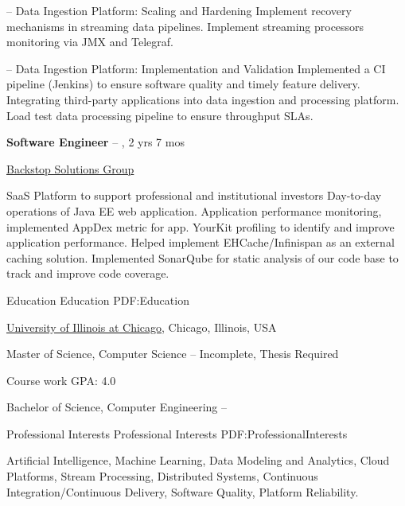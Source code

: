 \documentclass[letterpaper,MMMyyyy,nonstopmode]{simpleresumecv}
\begin{document}
\begin{Body}
\Gap
\BulletItem
{} --  Data Ingestion Platform: Scaling and Hardening
\SubBulletItem Implement recovery mechanisms in streaming data pipelines.
\SubBulletItem Implement streaming processors monitoring via JMX and Telegraf.

\Gap
\BulletItem
{} --  Data Ingestion Platform: Implementation and Validation
\SubBulletItem Implemented a CI pipeline (Jenkins) to ensure software quality and timely feature delivery.
\SubBulletItem Integrating third-party applications into data ingestion and processing platform.
\SubBulletItem Load test data processing pipeline to ensure throughput SLAs.


\BigGap
\Entry
\textbf{Software Engineer}
\hfill
{} -- , 2 yrs 7 mos

\href{https://www.backstopsolutions.com}{Backstop Solutions Group}

\BigGap
\BulletItem
SaaS Platform to support professional and institutional investors
\SubBulletItem Day-to-day operations of Java EE web application.
\SubBulletItem Application performance monitoring, implemented AppDex metric for app.
\SubBulletItem YourKit profiling to identify and improve application performance.
\SubBulletItem Helped implement EHCache/Infinispan as an external caching solution.
\SubBulletItem Implemented SonarQube for static analysis of our code base to track and improve code coverage.
\BigGap


\Section
{Education}
{Education}
{PDF:Education}

\Entry
\href{https://www.cs.uic.edu}
{University of Illinois at Chicago},
Chicago, Illinois, USA

\Gap
\BulletItem
Master of Science, Computer Science
\hfill
{} -- Incomplete, Thesis Required

\SubBulletItem
Course work GPA: 4.0

\Gap
\BulletItem
Bachelor of Science, Computer Engineering
\hfill
{} --

\BigGap


\Section
{Professional Interests}
{Professional Interests}
{PDF:ProfessionalInterests}

\Entry
Artificial Intelligence,
Machine Learning,
Data Modeling and Analytics,
Cloud Platforms,
Stream Processing,
Distributed Systems,
Continuous Integration/Continuous Delivery,
Software Quality,
Platform Reliability.


\end{Body}
\end{document}
